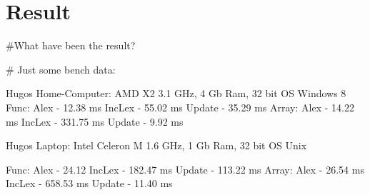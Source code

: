 \chapter{Result}
\#What have been the result?

\# Just some bench data:

Hugos Home-Computer: AMD X2 3.1 GHz, 4 Gb Ram, 32 bit OS Windows 8
Func:
  Alex - 12.38 ms
  IncLex - 55.02 ms
  Update - 35.29 ms
Array:
  Alex - 14.22 ms
  IncLex - 331.75 ms
  Update - 9.92 ms

Hugos Laptop: Intel Celeron M 1.6 GHz, 1 Gb Ram, 32 bit OS Unix

Func:
  Alex - 24.12
  IncLex - 182.47 ms
  Update - 113.22 ms
Array:
  Alex - 26.54 ms
  IncLex - 658.53 ms
  Update - 11.40 ms

